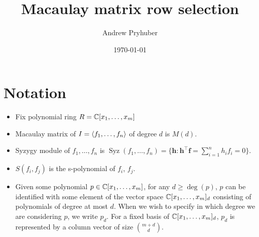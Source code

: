 \documentclass[10pt,letterpaper,oneside]{amsart}
\title{Macaulay matrix row selection}
\author{Andrew Pryhuber}
\date{\today}
\DeclareMathOperator{\Syz}{Syz}
\renewcommand{\bf}{\mathbf}
\begin{document}
\maketitle


\section{Notation}

\begin{itemize}
    \item Fix polynomial ring $R = \mathbb{C}[x_1, \dots, x_m]$
    \item Macaulay matrix of $I = \langle f_1, \dots, f_n\rangle$ of degree $d$ is $M(d)$.
    \item Syzygy module of $f_1, \dots, f_n$ is $\Syz(f_1, \dots, f_n) = \{\bf{h} : \bf{h}^\top \bf{f} = \sum_{i= 1}^n h_if_i = 0\}$.
    \item $S(f_i,f_j)$ is the s-polynomial of $f_i$, $f_j$.
    \item Given some polynomial $p \in \mathbb{C}[x_1, \dots, x_m]$, for any $d \ge \deg(p)$, $p$ can be identified with some element of the vector space $\mathbb{C}[x_1, \dots, x_m]_d$ consisting of polynomials of degree at most $d$. When we wish to specify in which degree we are considering $p$, we write $p_d$. For a fixed basis of $\mathbb{C}[x_1, \dots, x_m]_d$, $p_d$ is represented by a column vector of size ${ m +d \choose d}$. 
\end{itemize}
\end{document}
